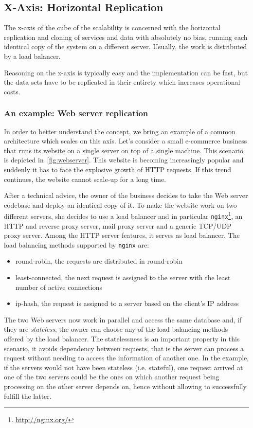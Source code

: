 \subsection{X-Axis: Horizontal Replication}
\label{sec:x-axis}

The x-axis of the cube of the scalability is concerned with the horizontal
replication and cloning of services and data with absolutely no bias, running
each identical copy of the system on a different server. Usually, the work is
distributed by a load balancer.

Reasoning on the x-axis is typically easy and the implementation can be fast,
but the data sets have to be replicated in their entirety which increases
operational costs.

\subsubsection{An example: Web server replication}
In order to better understand the concept, we bring an example of a common
architecture which scales on this axis. Let's consider a small e-commerce
business that runs its website on a single server on top of a single machine.
This scenario is depicted in~\autoref{fig:webserver}. This website is becoming
increasingly popular and suddenly it has to face the explosive growth of HTTP
requests. If this trend continues, the website cannot scale-up for a long time.

After a technical advice, the owner of the business decides to take the Web
server codebase and deploy an identical copy of it. To make the website work
on two different servers, she decides to use a load balancer and in particular
\texttt{nginx}\footnote{\url{http://nginx.org/}}, an HTTP and reverse proxy
server, mail proxy server and a generic TCP/UDP proxy server. Among the HTTP
server features, it serves as load balancer. The load balancing methods
supported by \texttt{nginx} are:

\begin{itemize}
  \item round-robin, the requests are distributed in round-robin
  \item least-connected, the next request is assigned to the server with the
  least number of active connections
  \item ip-hash, the request is assigned to a server based on the client's IP
  address
\end{itemize}

The two Web servers now work in parallel and access the same database and, if
they are \emph{stateless}, the owner can choose any of the load balancing
methods offered by the load balancer. The statelessness is an important property
in this scenario, it avoids dependency between requests, that is the server can
process a request without needing to access the information of another one. In
the example, if the servers would not have been stateless (i.e. stateful), one
request arrived at one of the two servers could be the ones on which another
request being processing on the other server depends on, hence without
allowing to successfully fulfill the latter.

